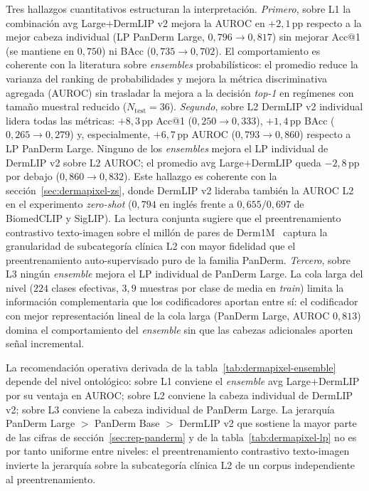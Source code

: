 Tres hallazgos cuantitativos estructuran la interpretación.
\textit{Primero}, sobre L1 la combinación avg Large$+$DermLIP v2
mejora la AUROC en $+2{,}1$\,pp respecto a la mejor cabeza
individual (LP PanDerm Large, $0{,}796 \to 0{,}817$) sin mejorar
Acc@1 (se mantiene en $0{,}750$) ni BAcc ($0{,}735 \to
0{,}702$). El comportamiento es coherente con la literatura sobre
\emph{ensembles} probabilísticos: el promedio reduce la varianza
del ranking de probabilidades y mejora la métrica discriminativa
agregada (AUROC) sin trasladar la mejora a la decisión \emph{top-1}
en regímenes con tamaño muestral reducido
($N_{\mathrm{test}} = 36$).
\textit{Segundo}, sobre L2 DermLIP v2 individual lidera todas las
métricas: $+8{,}3$\,pp Acc@1 ($0{,}250 \to 0{,}333$),
$+1{,}4$\,pp BAcc ($0{,}265 \to 0{,}279$) y, especialmente,
$+6{,}7$\,pp AUROC ($0{,}793 \to 0{,}860$) respecto a LP
PanDerm Large. Ninguno de los \emph{ensembles} mejora el LP
individual de DermLIP v2 sobre L2 AUROC; el promedio avg
Large$+$DermLIP queda $-2{,}8$\,pp por debajo
($0{,}860 \to 0{,}832$). Este hallazgo es coherente con la
secci\'on~\ref{sec:dermapixel-zs}, donde DermLIP v2 lideraba
también la AUROC L2 en el experimento \emph{zero-shot}
($0{,}794$ en inglés frente a $0{,}655 / 0{,}697$ de BiomedCLIP
y SigLIP). La lectura conjunta sugiere que el preentrenamiento
contrastivo texto-imagen sobre el millón de pares de
Derm1M~\cite{derm1m} captura la granularidad de subcategoría
clínica L2 con mayor fidelidad que el preentrenamiento
auto-supervisado puro de la familia PanDerm.
\textit{Tercero}, sobre L3 ningún \emph{ensemble} mejora el LP
individual de PanDerm Large. La cola larga del nivel
($224$ clases efectivas, $3{,}9$ muestras por clase de media
en \emph{train}) limita la información complementaria que los
codificadores aportan entre sí: el codificador con mejor
representación lineal de la cola larga (PanDerm Large, AUROC
$0{,}813$) domina el comportamiento del \emph{ensemble} sin que
las cabezas adicionales aporten señal incremental.

La recomendación operativa derivada de la
tabla~\ref{tab:dermapixel-ensemble} depende del nivel ontológico:
sobre L1 conviene el \emph{ensemble} avg Large$+$DermLIP por su
ventaja en AUROC; sobre L2 conviene la cabeza individual de
DermLIP v2; sobre L3 conviene la cabeza individual de PanDerm
Large. La jerarquía PanDerm Large $>$ PanDerm Base $>$ DermLIP
v2 que sostiene la mayor parte de las cifras de
secci\'on~\ref{sec:rep-panderm} y de la
tabla~\ref{tab:dermapixel-lp} no es por tanto uniforme entre
niveles: el preentrenamiento contrastivo texto-imagen invierte
la jerarquía sobre la subcategoría clínica L2 de un corpus
independiente al preentrenamiento.

